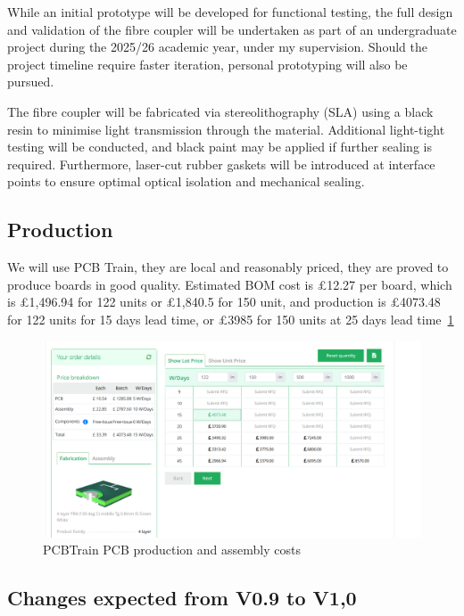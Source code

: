 \documentclass[a4paper,11pt]{article}
\begin{document}
While an initial prototype will be developed for functional testing, the full design and validation of the fibre coupler will be undertaken as part of an undergraduate project during the 2025/26 academic year, under my supervision. Should the project timeline require faster iteration, personal prototyping will also be pursued.

The fibre coupler will be fabricated via stereolithography (SLA) using a black resin to minimise light transmission through the material. Additional light-tight testing will be conducted, and black paint may be applied if further sealing is required. Furthermore, laser-cut rubber gaskets will be introduced at interface points to ensure optimal optical isolation and mechanical sealing.

\subsection{Production}

We will use PCB Train, they are local and reasonably priced, they are proved to produce boards in good quality. Estimated BOM cost is £12.27 per board, which is £1,496.94 for 122 units or £1,840.5 for 150 unit, and production is £4073.48 for 122 units for 15 days lead time, or £3985 for 150 units at 25 days lead time~\ref{fig:PCBTrainOrder}

\begin{figure}[htbp]
\centering
\includegraphics[scale=0.5]{PCBTrainOrder.png}
\caption{PCBTrain PCB production and assembly costs\label{fig:PCBTrainOrder}}
\end{figure}


\subsection{Changes expected from V0.9 to V1,0}
\end{document}
